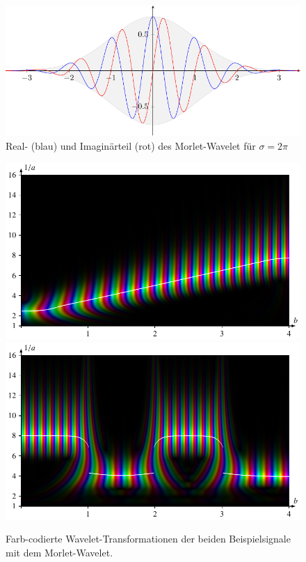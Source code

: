 \begin{figure}
	\centering
	\includegraphics{papers/complex/images/morlet.pdf}
	\caption{Real- (blau) und Imaginärteil (rot) des Morlet-Wavelet für $\sigma = 2\pi$ \label{complex:morlet}}
\end{figure}

\begin{figure}
	\centering
	\includegraphics{papers/complex/images/chirp_morlet.pdf}
	\includegraphics{papers/complex/images/square_morlet.pdf}
	\caption{Farb-codierte Wavelet-Transformationen der beiden Beispielsignale mit dem Morlet-Wavelet.}
	\label{complex:morlet-ex}
\end{figure}
